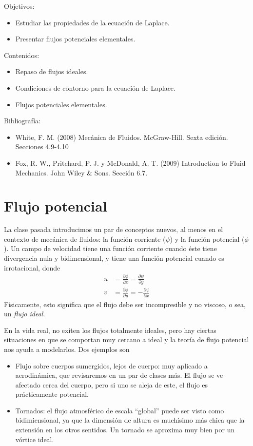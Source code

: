 \begin{framed}

Objetivos:
\begin{itemize}
    \item Estudiar las propiedades de la ecuación de Laplace. 
    \item Presentar flujos potenciales elementales. 
\end{itemize}

Contenidos:
\begin{itemize}
    \item Repaso de flujos ideales.
    \item Condiciones de contorno para la ecuación de Laplace.
    \item Flujos potenciales elementales.
\end{itemize}

Bibliografía:
\begin{itemize}
    \item White, F. M. (2008) Mecánica de Fluidos. McGraw-Hill. Sexta edición. Secciones 4.9-4.10
    \item Fox, R. W., Pritchard, P. J. y McDonald, A. T. (2009) Introduction to Fluid Mechanics. John Wiley \& Sons. Sección 6.7.
\end{itemize}
\end{framed}

\section*{Flujo potencial}
La clase pasada introducimos un par de conceptos nuevos, al menos en el contexto de mecánica de fluidos: la función corriente ($\psi$) y la función potencial ($\phi$). 
Un campo de velocidad tiene una función corriente cuando éste tiene divergencia nula y bidimensional, y tiene una función potencial cuando es irrotacional, donde
%
\begin{align}\label{eq:phi_def_3}
u &= \frac{\partial\phi}{\partial x} = \frac{\partial\psi}{\partial y}\nonumber\\
v &= \frac{\partial\phi}{\partial y} = -\frac{\partial\psi}{\partial x}
\end{align}
%
Físicamente, esto significa que el flujo debe ser incompresible y no viscoso, o sea, un \emph{flujo ideal}.

En la vida real, no exiten los flujos totalmente ideales, pero hay ciertas situaciones en que se comportan muy cercano a ideal y la teoría de flujo potencial nos ayuda a modelarlos.
Dos ejemplos son
\begin{itemize}
\item Flujo sobre cuerpos sumergidos, lejos de cuerpo: muy aplicado a aerodinámica, que revisaremos en un par de clases más. El flujo se ve afectado cerca del cuerpo, pero si uno se aleja de este, el flujo es prácticamente potencial.
\item Tornados: el flujo atmosférico de escala ``global'' puede ser visto como bidimiensional, ya que la dimensión de altura es muchísimo más chica que la extensión en los otros sentidos. Un tornado se aproxima muy bien por un vórtice ideal.
\end{itemize}

